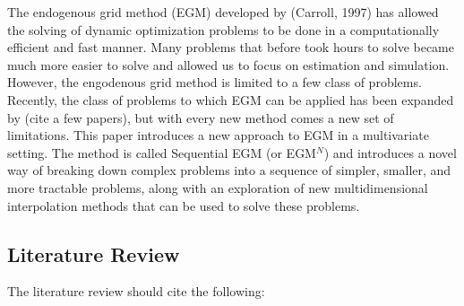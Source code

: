 \documentclass[\econtexRoot/EGMN]{subfiles}
\begin{document}




The endogenous grid method (EGM) developed by (Carroll, 1997) has allowed the solving of dynamic optimization problems to be done in a computationally efficient and fast manner. Many problems that before took hours to solve became much more easier to solve and allowed us to focus on estimation and simulation.
However, the engodenous grid method is limited to a few class of problems. Recently, the class of problems to which EGM can be applied has been expanded by (cite a few papers), but with every new method comes a new set of limitations.
This paper introduces a new approach to EGM in a multivariate setting. The method is called Sequential EGM (or EGM$^N$) and introduces a novel way of breaking down complex problems into a sequence of simpler, smaller, and more tractable problems, along with an exploration of new multidimensional interpolation methods that can be used to solve these problems.

\subsection{Literature Review} %

The literature review should cite the following:



\cite{Druedahl2021-wl,Ludwig2018-uz,Ludwig2016-tq,Iskhakov2015-jy,Maliar2013-sv,Carroll2006-wq,Jorgensen2013-du,Maliar2011-dj,White2015-fg,Hintermaier2010-io,Barillas2007-uh,Druedahl2017-vn,Iskhakov2017-my,Mendoza2020-jd,Fella2014-my}
\end{document}
